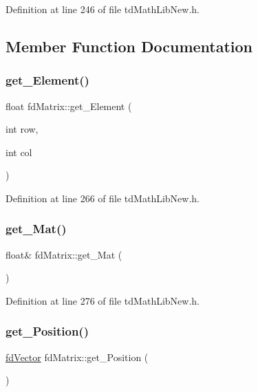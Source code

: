 Definition at line 246 of file td\+Math\+Lib\+New.\+h.



\subsection{Member Function Documentation}
\hypertarget{classfd_matrix_adc766258b224549bfa242acd2b83b1fd}{}\label{classfd_matrix_adc766258b224549bfa242acd2b83b1fd} 
\subsubsection{\texorpdfstring{get\+\_\+\+Element()}{get\_Element()}}
{\footnotesize\ttfamily float fd\+Matrix\+::get\+\_\+\+Element (\begin{DoxyParamCaption}\item[{int}]{row,  }\item[{int}]{col }\end{DoxyParamCaption})\hspace{0.3cm}{\ttfamily [inline]}}



Definition at line 266 of file td\+Math\+Lib\+New.\+h.

\hypertarget{classfd_matrix_a523606adda02a993fd940d6fc4a1a0a2}{}\label{classfd_matrix_a523606adda02a993fd940d6fc4a1a0a2} 
\subsubsection{\texorpdfstring{get\+\_\+\+Mat()}{get\_Mat()}}
{\footnotesize\ttfamily float\& fd\+Matrix\+::get\+\_\+\+Mat (\begin{DoxyParamCaption}{ }\end{DoxyParamCaption})\hspace{0.3cm}{\ttfamily [inline]}}



Definition at line 276 of file td\+Math\+Lib\+New.\+h.

\hypertarget{classfd_matrix_af955a03dc22bb94e5541f7d1ce52bb15}{}\label{classfd_matrix_af955a03dc22bb94e5541f7d1ce52bb15} 
\subsubsection{\texorpdfstring{get\+\_\+\+Position()}{get\_Position()}}
{\footnotesize\ttfamily \hyperlink{classfd_vector}{fd\+Vector} fd\+Matrix\+::get\+\_\+\+Position (\begin{DoxyParamCaption}{ }\end{DoxyParamCaption})\hspace{0.3cm}{\ttfamily [inline]}}



